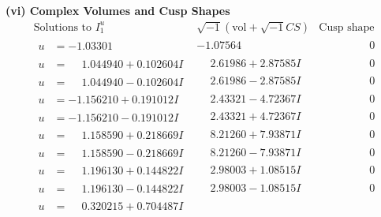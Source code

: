 \documentclass[1p]{elsarticle_modified}
\theoremstyle{definition}
\newcommand{\I}{\sqrt{-1}}
\begin{document}
\newpage\flushleft \textbf{(vi) Complex Volumes and Cusp Shapes}
$$\begin{array}{c|c|c}  
\text{Solutions to }I^u_{1}& \I (\text{vol} + \sqrt{-1}CS) & \text{Cusp shape}\\
 \hline 
\begin{aligned}
u &= -1.03301\phantom{ +0.000000I}\end{aligned}
 & -1.07564\phantom{ +0.000000I} & \phantom{-0.000000 } 0 \\ \hline\begin{aligned}
u &= \phantom{-}1.044940 + 0.102604 I\end{aligned}
 & \phantom{-}2.61986 + 2.87585 I & \phantom{-0.000000 } 0 \\ \hline\begin{aligned}
u &= \phantom{-}1.044940 - 0.102604 I\end{aligned}
 & \phantom{-}2.61986 - 2.87585 I & \phantom{-0.000000 } 0 \\ \hline\begin{aligned}
u &= -1.156210 + 0.191012 I\end{aligned}
 & \phantom{-}2.43321 - 4.72367 I & \phantom{-0.000000 } 0 \\ \hline\begin{aligned}
u &= -1.156210 - 0.191012 I\end{aligned}
 & \phantom{-}2.43321 + 4.72367 I & \phantom{-0.000000 } 0 \\ \hline\begin{aligned}
u &= \phantom{-}1.158590 + 0.218669 I\end{aligned}
 & \phantom{-}8.21260 + 7.93871 I & \phantom{-0.000000 } 0 \\ \hline\begin{aligned}
u &= \phantom{-}1.158590 - 0.218669 I\end{aligned}
 & \phantom{-}8.21260 - 7.93871 I & \phantom{-0.000000 } 0 \\ \hline\begin{aligned}
u &= \phantom{-}1.196130 + 0.144822 I\end{aligned}
 & \phantom{-}2.98003 + 1.08515 I & \phantom{-0.000000 } 0 \\ \hline\begin{aligned}
u &= \phantom{-}1.196130 - 0.144822 I\end{aligned}
 & \phantom{-}2.98003 - 1.08515 I & \phantom{-0.000000 } 0 \\ \hline\begin{aligned}
u &= \phantom{-}0.320215 + 0.704487 I\end{aligned}

\end{array}$$
\end{document}
